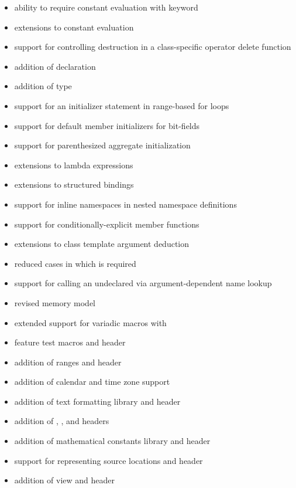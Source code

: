 \begin{itemize}
\item ability to require constant evaluation with  keyword
\item extensions to constant evaluation
\item support for controlling destruction in a class-specific operator delete function
\item addition of   declaration
\item addition of  type
\item support for an initializer statement in range-based for loops
\item support for default member initializers for bit-fields
\item support for parenthesized aggregate initialization
\item extensions to lambda expressions
\item extensions to structured bindings
\item support for inline namespaces in nested namespace definitions
\item support for conditionally-explicit member functions
\item extensions to class template argument deduction
\item reduced cases in which  is required
\item support for calling an undeclared 
via argument-dependent name lookup
\item revised memory model
\item extended support for variadic macros with 
\item feature test macros and  header
\item addition of ranges and  header
\item addition of calendar and time zone support
\item addition of text formatting library and  header
\item addition of , , and  headers
\item addition of mathematical constants library and  header
\item support for representing source locations and  header
\item addition of  view and  header

\end{itemize}
